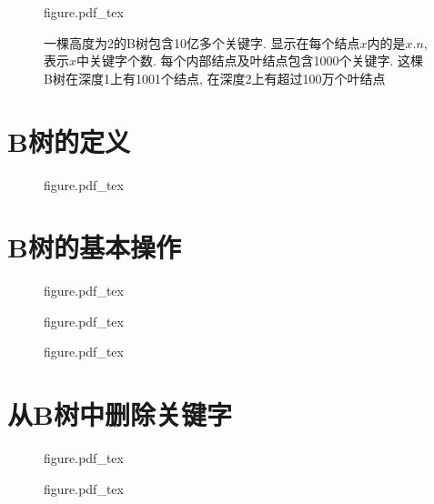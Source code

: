 \documentclass[oneside,10pt,fontset=none]{ctexbook}
\numberwithin{definition}{chapter}
\numberwithin{theorem}{chapter}
\numberwithin{lemma}{chapter}
\begin{document}
\begin{figure}[htbp]
    \centering
    \def\svgwidth{\columnwidth}
    {figure.pdf_tex}
    \caption{一棵高度为2的B树包含10亿多个关键字. 显示在每个结点$x$内的是$x.n$, 表示$x$中关键字个数. 每个内部结点及叶结点包含1000个关键字. 这棵B树在深度1上有1001个结点, 在深度2上有超过100万个叶结点}
    \label{fig:10亿个关键字的B树}
\end{figure}

\section{B树的定义}\label{section:B树的定义}

\begin{figure}[htbp]
    \def\svgwidth{\columnwidth}
    {figure.pdf_tex}
\end{figure}

\section{B树的基本操作}\label{section:B树的基本操作}

\begin{figure}[htbp]
    \def\svgwidth{\columnwidth}
    {figure.pdf_tex}
\end{figure}

\begin{figure}[htbp]
    \def\svgwidth{\columnwidth}
    {figure.pdf_tex}
\end{figure}

\begin{figure}[htbp]
    \def\svgwidth{\columnwidth}
    {figure.pdf_tex}
\end{figure}

\section{从B树中删除关键字}\label{section:从B树中删除关键字}

\begin{figure}[htbp]
    \def\svgwidth{\columnwidth}
    {figure.pdf_tex}
\end{figure}

\begin{figure}[htbp]
    \def\svgwidth{\columnwidth}
    {figure.pdf_tex}
\end{figure}
\end{document}
